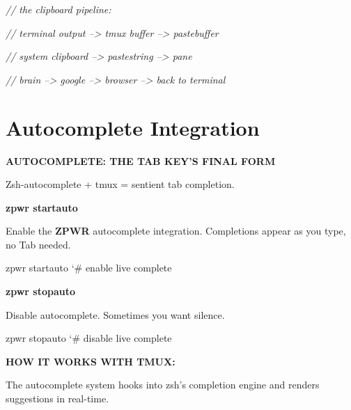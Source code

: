 \documentclass[11pt,a4paper,twoside]{book}
\begin{document}
{\small\itshape\color{dimtext} // the clipboard pipeline:}

{\small\itshape\color{dimtext} //   terminal output --> tmux buffer --> pastebuffer}

{\small\itshape\color{dimtext} //   system clipboard --> pastestring --> pane}

{\small\itshape\color{dimtext} //   brain --> google --> browser --> back to terminal}


\vspace{16pt}

\section{Autocomplete Integration}


\vspace{10pt}
{\large\bfseries\color{neoncyan} AUTOCOMPLETE: THE TAB KEY'S FINAL FORM}\vspace{6pt}

Zsh-autocomplete + tmux = sentient tab completion.


\vspace{12pt}
{\bfseries\color{neonyellow} zpwr startauto}\vspace{4pt}

Enable the \textbf{ZPWR} autocomplete integration. Completions appear as you type, no Tab needed.

\begin{codebox}
\color{neongreen}zpwr startauto              {\char`\#} enable live complete\\
\end{codebox}


\vspace{12pt}
{\bfseries\color{neonyellow} zpwr stopauto}\vspace{4pt}

Disable autocomplete. Sometimes you want silence.

\begin{codebox}
\color{neongreen}zpwr stopauto               {\char`\#} disable live complete\\
\end{codebox}


\vspace{12pt}
{\bfseries\color{neonyellow} HOW IT WORKS WITH TMUX:}\vspace{4pt}

The autocomplete system hooks into zsh's completion engine and renders suggestions in real-time.
\end{document}
